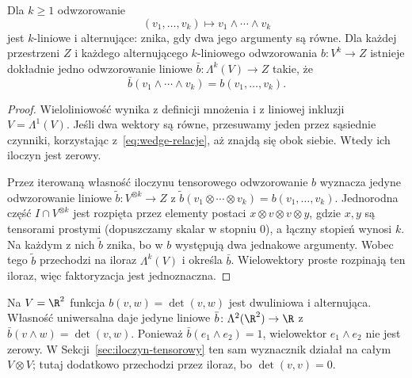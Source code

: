\begin{twierdzenie}
\label{thm:wedge-multilinear}
Dla $k\geq1$ odwzorowanie
\[
 (v_1,\ldots,v_k)\longmapsto v_1\wedge\cdots\wedge v_k
\]
jest $k$-liniowe i alternujące: znika, gdy dwa jego argumenty
są równe. Dla każdej przestrzeni $Z$ i każdego alternującego
$k$-liniowego odwzorowania $b\colon V^k\to Z$ istnieje dokładnie jedno
odwzorowanie liniowe $\bar b\colon\Lambda^k(V)\to Z$ takie, że
\[
 \bar b(v_1\wedge\cdots\wedge v_k)=b(v_1,\ldots,v_k).
\]
\end{twierdzenie}
\begin{proof}
Wieloliniowość wynika z definicji mnożenia i z liniowej
inkluzji $V=\Lambda^1(V)$. Jeśli dwa wektory są równe,
przesuwamy jeden przez sąsiednie czynniki, korzystając
z~\eqref{eq:wedge-relacje}, aż znajdą się obok siebie.
Wtedy ich iloczyn jest zerowy.

Przez iterowaną własność iloczynu tensorowego odwzorowanie $b$
wyznacza jedyne odwzorowanie liniowe
$\widetilde b\colon V^{\otimes k}\to Z$ z
$\widetilde b(v_1\otimes\cdots\otimes v_k)=b(v_1,\ldots,v_k)$.
Jednorodna część $I\cap V^{\otimes k}$ jest rozpięta
przez elementy postaci
$x\otimes v\otimes v\otimes y$, gdzie $x,y$ są tensorami
prostymi (dopuszczamy skalar w stopniu $0$), a łączny stopień
wynosi $k$. Na każdym z nich
$\widetilde b$ znika, bo w $b$ występują dwa jednakowe
argumenty. Wobec tego $\widetilde b$ przechodzi na iloraz
$\Lambda^k(V)$ i określa $\bar b$.
Wielowektory proste rozpinają ten iloraz, więc faktoryzacja
jest jednoznaczna.
\end{proof}

\begin{przyklad}
Na $V=\R^2$ funkcja $b(v,w)=\det(v,w)$ jest dwuliniowa
i alternująca. Własność uniwersalna daje jedyne liniowe
$\bar b\colon\Lambda^2(\R^2)\to\R$ z
$\bar b(v\wedge w)=\det(v,w)$.
Ponieważ $\bar b(e_1\wedge e_2)=1$, wielowektor
$e_1\wedge e_2$ nie jest zerowy. W
Sekcji~\ref{sec:iloczyn-tensorowy} ten sam
wyznacznik działał na całym $V\otimes V$;
tutaj dodatkowo przechodzi przez iloraz, bo
$\det(v,v)=0$.
\end{przyklad}

